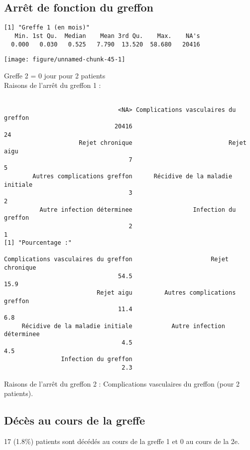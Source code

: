 \documentclass[11pt,a4paper]{article}\usepackage[]{graphicx}\usepackage[]{color}
\makeatletter
\def\maxwidth{ %
  \ifdim\Gin@nat@width>\linewidth
    \linewidth
  \else
    \Gin@nat@width
  \fi
}
\newenvironment{kframe}{%
 \def\at@end@of@kframe{}%
 \ifinner\ifhmode%
  \def\at@end@of@kframe{\end{minipage}}%
  \begin{minipage}{\columnwidth}%
 \fi\fi%
 \def\FrameCommand##1{\hskip\@totalleftmargin \hskip-\fboxsep
 \colorbox{shadecolor}{##1}\hskip-\fboxsep
     \hskip-\linewidth \hskip-\@totalleftmargin \hskip\columnwidth}%
 \MakeFramed {\advance\hsize-\width
   \@totalleftmargin\z@ \linewidth\hsize
   \@setminipage}}%
 {\par\unskip\endMakeFramed%
 \at@end@of@kframe}
\newenvironment{knitrout}{}{} %
\makeatother
\begin{document}
  \subsection{Arrêt de fonction du greffon}
  
\begin{knitrout}
\color{fgcolor}\begin{kframe}
\begin{verbatim}
[1] "Greffe 1 (en mois)"
   Min. 1st Qu.  Median    Mean 3rd Qu.    Max.    NA's 
  0.000   0.030   0.525   7.790  13.520  58.680   20416 
\end{verbatim}
\end{kframe}
\texttt{[image: figure/unnamed-chunk-45-1]} 

\end{knitrout}
Greffe 2 = 0 jour pour 2 patients
~\\

Raisons de l'arrêt du greffon 1 :
\begin{knitrout}
\color{fgcolor}\begin{kframe}
\begin{verbatim}

                                <NA> Complications vasculaires du greffon 
                               20416                                   24 
                     Rejet chronique                           Rejet aigu 
                                   7                                    5 
        Autres complications greffon      Récidive de la maladie initiale 
                                   3                                    2 
          Autre infection déterminee                 Infection du greffon 
                                   2                                    1 
[1] "Pourcentage :"

Complications vasculaires du greffon                      Rejet chronique 
                                54.5                                 15.9 
                          Rejet aigu         Autres complications greffon 
                                11.4                                  6.8 
     Récidive de la maladie initiale           Autre infection déterminee 
                                 4.5                                  4.5 
                Infection du greffon 
                                 2.3 
\end{verbatim}
\end{kframe}
\end{knitrout}

Raisons de l'arrêt du greffon 2 : Complications vasculaires du greffon  (pour 2 patients).

  \subsection{Décès au cours de la greffe}

17 (1.8\%) patients sont décédés au cours de la greffe 1 et 0 au cours de la 2e.
\end{document}
